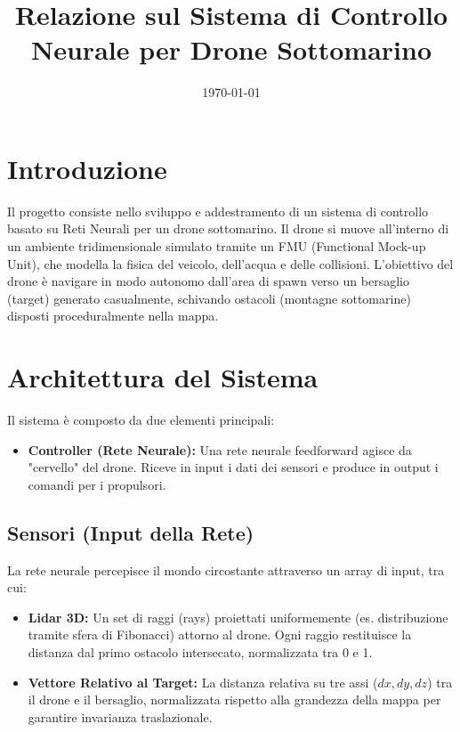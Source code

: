 \documentclass[12pt,a4paper]{article}
\title{Relazione sul Sistema di Controllo Neurale per Drone Sottomarino}
\author{}
\date{\today}
\begin{document}
\maketitle

\tableofcontents
\newpage

\section{Introduzione}
Il progetto consiste nello sviluppo e addestramento di un sistema di controllo basato su Reti Neurali per un drone sottomarino. Il drone si muove all'interno di un ambiente tridimensionale simulato tramite un FMU (Functional Mock-up Unit), che modella la fisica del veicolo, dell'acqua e delle collisioni.
L'obiettivo del drone è navigare in modo autonomo dall'area di spawn verso un bersaglio (target) generato casualmente, schivando ostacoli (montagne sottomarine) disposti proceduralmente nella mappa.

\section{Architettura del Sistema}
Il sistema è composto da due elementi principali:
\begin{itemize}
    \textbf{Ambiente (Environment) e Fisica (FMU):} L'ambiente genera proceduralmente i confini della mappa, la posizione degli ostacoli sottomarini (sfere o cilindri) e del target. La fisica del drone è delegata allo standard FMI/FMU, che calcola cinematiche e dinamiche.
    \item \textbf{Controller (Rete Neurale):} Una rete neurale feedforward agisce da "cervello" del drone. Riceve in input i dati dei sensori e produce in output i comandi per i propulsori.
\end{itemize}

\subsection{Sensori (Input della Rete)}
La rete neurale percepisce il mondo circostante attraverso un array di input, tra cui:
\begin{itemize}
    \item \textbf{Lidar 3D:} Un set di raggi (rays) proiettati uniformemente (es. distribuzione tramite sfera di Fibonacci) attorno al drone. Ogni raggio restituisce la distanza dal primo ostacolo intersecato, normalizzata tra 0 e 1.
    \item \textbf{Vettore Relativo al Target:} La distanza relativa su tre assi ($dx, dy, dz$) tra il drone e il bersaglio, normalizzata rispetto alla grandezza della mappa per garantire invarianza traslazionale.
\end{itemize}
\end{document}
